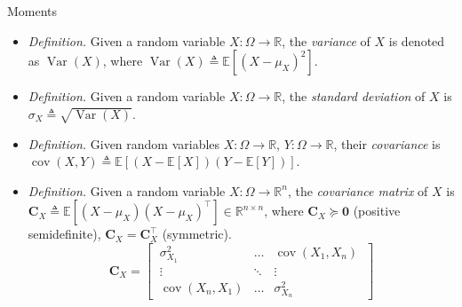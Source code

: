 \documentclass{beamer}
\numberwithin{equation}{section}
\begin{document}
\begin{frame}{Moments}
    \begin{itemize}
        \item
        \textit{Definition.} Given a random variable $ X : \Omega \rightarrow
        \mathbb{R} $, the \textit{variance} of $ X $ is denoted as
        $ \operatorname{Var}(X) $, where $ \operatorname{Var}(X) \triangleq
        \mathbb{E}\left[(X - \mu_X)^2\right] $.

        \item
        \textit{Definition.} Given a random variable $ X : \Omega \rightarrow
        \mathbb{R} $, the \textit{standard deviation} of $ X $ is
        $ \sigma_X \triangleq \sqrt{\operatorname{Var}(X)} $.

        \item
        \textit{Definition.} Given random variables
        $ X : \Omega \rightarrow \mathbb{R} $,
        $ Y : \Omega \rightarrow \mathbb{R} $, their \textit{covariance} is
        $ \operatorname{cov}(X, Y) \triangleq
        \mathbb{E}[(X - \mathbb{E}[X])(Y - \mathbb{E}[Y])] $.

        \item
        \textit{Definition.} Given a random variable $ X : \Omega \rightarrow
        \mathbb{R}^n $, the \textit{covariance matrix} of $ X $ is
        $ \mathbf{C}_X \triangleq \mathbb{E}\left[(X - \mu_X)
        (X - \mu_X)^\top\right] \in \mathbb{R}^{n \times n} $, where
        $ \mathbf{C}_X \succeq \mathbf{0} $ (positive semidefinite),
        $ \mathbf{C}_X = \mathbf{C}_X^\top $ (symmetric).
        \begin{equation*}
            \mathbf{C}_X = \begin{bmatrix}
                \ \sigma_{X_1}^2 & \ldots & \operatorname{cov}(X_1, X_n) \ \\
                \ \vdots & \ddots & \vdots \ \\
                \ \operatorname{cov}(X_n, X_1) & \ldots & \sigma_{X_n}^2 \
            \end{bmatrix}
        \end{equation*}
    \end{itemize}
\end{frame}
\end{document}
